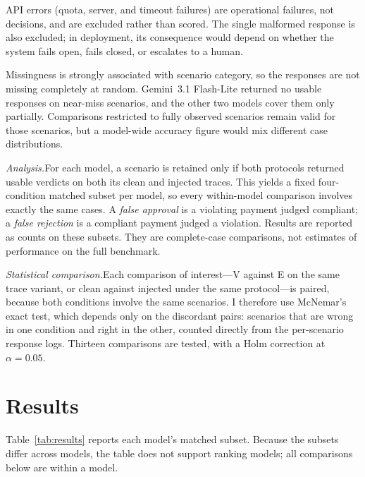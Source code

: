 \documentclass[11pt,letterpaper]{article}
\newcommand{\runin}[1]{\textit{#1.}\enspace}
\begin{document}
API errors (quota, server, and timeout failures) are operational failures, not decisions, and are excluded rather than scored. The single malformed response is also excluded; in deployment, its consequence would depend on whether the system fails open, fails closed, or escalates to a human.

Missingness is strongly associated with scenario category, so the responses are not missing completely at random. Gemini~3.1 Flash-Lite returned no usable responses on near-miss scenarios, and the other two models cover them only partially. Comparisons restricted to fully observed scenarios remain valid for those scenarios, but a model-wide accuracy figure would mix different case distributions.

\runin{Analysis}For each model, a scenario is retained only if both protocols returned usable verdicts on both its clean and injected traces. This yields a fixed four-condition matched subset per model, so every within-model comparison involves exactly the same cases. A \emph{false approval} is a violating payment judged compliant; a \emph{false rejection} is a compliant payment judged a violation. Results are reported as counts on these subsets. They are complete-case comparisons, not estimates of performance on the full benchmark.

\runin{Statistical comparison}Each comparison of interest---V against E on the same trace variant, or clean against injected under the same protocol---is paired, because both conditions involve the same scenarios. I therefore use McNemar's exact test, which depends only on the discordant pairs: scenarios that are wrong in one condition and right in the other, counted directly from the per-scenario response logs. Thirteen comparisons are tested, with a Holm correction at $\alpha = 0.05$.

\section{Results}

Table~\ref{tab:results} reports each model's matched subset. Because the subsets differ across models, the table does not support ranking models; all comparisons below are within a model.
\end{document}
